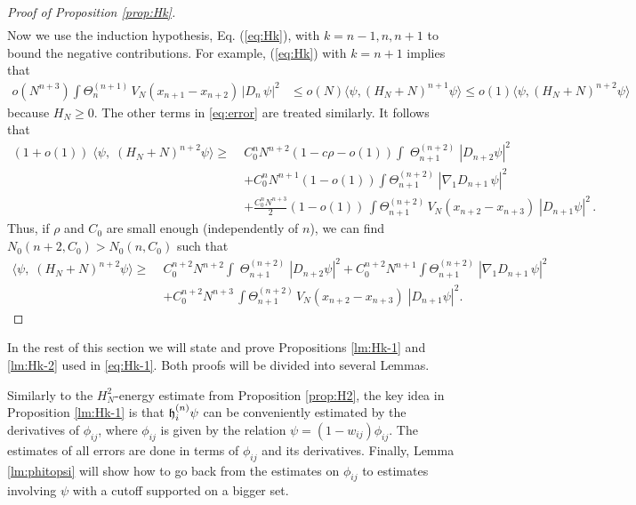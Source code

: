\documentclass[11pt]{article}
\newcommand{\fh}{{\frak h}}
\begin{document}
\begin{proof}[Proof of Proposition \ref{prop:Hk}]
\begin{equation}
\begin{split}
\end{split}
\end{equation}
Now we use the induction hypothesis, Eq. (\ref{eq:Hk}), with
$k=n-1,n,n+1$ to bound the negative contributions. For example,
(\ref{eq:Hk}) with $k=n+1$ implies that
\begin{equation*}
\begin{split}
o(N^{n+3}) \int \Theta^{(n+1)}_{n} \, V_N (x_{n+1} -x_{n+2})\, |D_n
\, \psi|^2 &\leq o(N) \langle \psi, (H_N + N)^{n+1} \psi \rangle
\leq o(1) \langle \psi, (H_N+N)^{n+2} \psi \rangle \end{split}
\end{equation*} because $H_N \geq 0$.  The other terms
in  \eqref{eq:error} are treated similarly. It follows that
\begin{equation*}
\begin{split}
(1 +o(1)) \; \langle \psi,\; (H_N+N)^{n+2} \psi \rangle  \geq \;
&C_0^n N^{n+2} (1- c\rho-o(1)) \int \; \Theta^{(n+2)}_{n+1} \;
|D_{n+2} \psi|^2
\\ &+ C_0^n N^{n+1} (1-o(1)) \int
\Theta^{(n+2)}_{n+1} \; |\nabla_1 D_{n+1} \,\psi|^2  \\ &+
\frac{C_0^n N^{n+3}}{2} (1-o(1)) \, \int \Theta^{(n+2)}_{n+1} \, V_N
(x_{n+2} -x_{n+3}) \; |D_{n+1} \psi|^2 \, .
\end{split}
\end{equation*}
Thus, if $\rho$ and $C_0$ are small enough (independently of $n$),
we can find $N_0 (n+2,C_0) > N_0 (n,C_0)$ such that
\begin{equation}
\begin{split}
\langle \psi,\; (H_N+N)^{n+2} \psi \rangle \geq \;& C_0^{n+2}
N^{n+2} \int \; \Theta^{(n+2)}_{n+1} \; |D_{n+2} \psi|^2 + C_0^{n+2}
N^{n+1} \int \Theta^{(n+2)}_{n+1} \; |\nabla_1 D_{n+1} \,\psi|^2  \\
&+ C_0^{n+2} N^{n+3} \, \int \Theta^{(n+2)}_{n+1} \, V_N (x_{n+2}
-x_{n+3}) \; |D_{n+1} \psi|^2.
\end{split}
\end{equation}
\end{proof}


\medskip

 In the rest of this section we will state and prove
Propositions  \ref{lm:Hk-1} and  \ref{lm:Hk-2} used in
\eqref{eq:Hk-1}. Both proofs will be divided into several Lemmas.

\medskip

Similarly to the $H_N^2$-energy estimate from Proposition
\ref{prop:H2}, the key idea in Proposition \ref{lm:Hk-1} is that
$\fh^{(n)}_i\psi$ can be conveniently estimated by the derivatives
of $\phi_{ij}$, where $\phi_{ij}$ is given by the relation $\psi=
(1-w_{ij})\phi_{ij}$. The estimates of  all errors are done in terms
of $\phi_{ij}$ and its derivatives. Finally, Lemma \ref{lm:phitopsi}
will show how to go back from the estimates on $\phi_{ij}$ to
estimates involving $\psi$ with a cutoff supported on a bigger set.
\end{document}
